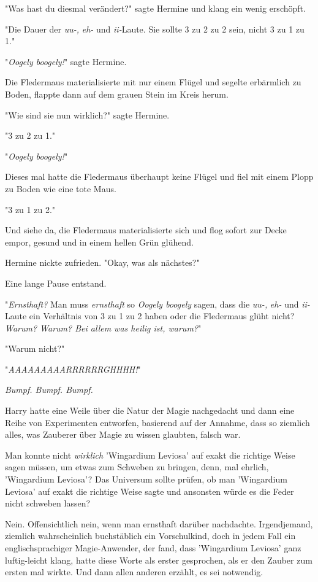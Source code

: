 {"Was hast du diesmal verändert?" sagte Hermine und klang ein wenig erschöpft.

"Die Dauer der \emph{uu-,} \emph{eh-} und \emph{ii-}Laute. Sie sollte 3 zu 2 zu 2 sein, nicht 3 zu 1 zu 1."

"\emph{Oogely boogely!}" sagte Hermine.

Die Fledermaus materialisierte mit nur einem Flügel und segelte erbärmlich zu Boden, flappte dann auf dem grauen Stein im Kreis herum.

"Wie sind sie nun wirklich?" sagte Hermine.

"3 zu 2 zu 1."

"\emph{Oogely boogely!}"

Dieses mal hatte die Fledermaus überhaupt keine Flügel und fiel mit einem Plopp zu Boden wie eine tote Maus.

"3 zu 1 zu 2."

Und siehe da, die Fledermaus materialisierte sich und flog sofort zur Decke empor, gesund und in einem hellen Grün glühend.

Hermine nickte zufrieden. "Okay, was als nächstes?"

Eine lange Pause entstand.

"\emph{Ernsthaft?} Man muss \emph{ernsthaft} so \emph{Oogely boogely} sagen, dass die \emph{uu-,} \emph{eh-} und \emph{ii-}Laute ein Verhältnis von 3 zu 1 zu 2 haben oder die Fledermaus glüht nicht? \emph{Warum? Warum? Bei allem was heilig ist, warum?}"

"Warum nicht?"

"\emph{AAAAAAAAARRRRRRGHHHH!}"

\emph{Bumpf. Bumpf. Bumpf.}

Harry hatte eine Weile über die Natur der Magie nachgedacht und dann eine Reihe von Experimenten entworfen, basierend auf der Annahme, dass so ziemlich alles, was Zauberer über Magie zu wissen glaubten, falsch war.

Man konnte nicht \emph{wirklich} 'Wingardium Leviosa' auf exakt die richtige Weise sagen müssen, um etwas zum Schweben zu bringen, denn, mal ehrlich, 'Wingardium Leviosa'? Das Universum sollte prüfen, ob man 'Wingardium Leviosa' auf exakt die richtige Weise sagte und ansonsten würde es die Feder nicht schweben lassen?

Nein. Offensichtlich nein, wenn man ernsthaft darüber nachdachte. Irgendjemand, ziemlich wahrscheinlich buchstäblich ein Vorschulkind, doch in jedem Fall ein englischsprachiger Magie-Anwender, der fand, dass 'Wingardium Leviosa' ganz luftig-leicht klang, hatte diese Worte als erster gesprochen, als er den Zauber zum ersten mal wirkte. Und dann allen anderen erzählt, es sei notwendig.

}
